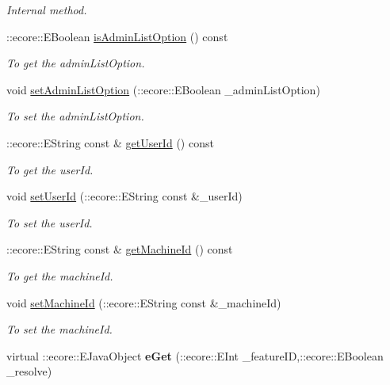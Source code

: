 \begin{DoxyCompactItemize}
\begin{DoxyCompactList}\small\item\em Internal method. \item\end{DoxyCompactList}\item 
::ecore::EBoolean \hyperlink{classUMS__Data_1_1ListLocalAccOptions_adc48e24eb91f9ea3234504bdf3ded823}{isAdminListOption} () const 
\begin{DoxyCompactList}\small\item\em To get the adminListOption. \item\end{DoxyCompactList}\item 
void \hyperlink{classUMS__Data_1_1ListLocalAccOptions_ae4b718d24610744490ca0ccbc248237d}{setAdminListOption} (::ecore::EBoolean \_\-adminListOption)
\begin{DoxyCompactList}\small\item\em To set the adminListOption. \item\end{DoxyCompactList}\item 
::ecore::EString const \& \hyperlink{classUMS__Data_1_1ListLocalAccOptions_a774a83106fad2a13edbb4d61aad772a8}{getUserId} () const 
\begin{DoxyCompactList}\small\item\em To get the userId. \item\end{DoxyCompactList}\item 
void \hyperlink{classUMS__Data_1_1ListLocalAccOptions_a12b06750d86db248c1a47fc21bb3c754}{setUserId} (::ecore::EString const \&\_\-userId)
\begin{DoxyCompactList}\small\item\em To set the userId. \item\end{DoxyCompactList}\item 
::ecore::EString const \& \hyperlink{classUMS__Data_1_1ListLocalAccOptions_ae96211f7f165d81db49cb168c367003e}{getMachineId} () const 
\begin{DoxyCompactList}\small\item\em To get the machineId. \item\end{DoxyCompactList}\item 
void \hyperlink{classUMS__Data_1_1ListLocalAccOptions_a94fdb1871f3b62dec3062358e0f0b905}{setMachineId} (::ecore::EString const \&\_\-machineId)
\begin{DoxyCompactList}\small\item\em To set the machineId. \item\end{DoxyCompactList}\item 
\hypertarget{classUMS__Data_1_1ListLocalAccOptions_a185a557e42eb104dbeda5dff4c82eee8}{
virtual ::ecore::EJavaObject {\bfseries eGet} (::ecore::EInt \_\-featureID,::ecore::EBoolean \_\-resolve)}
\label{classUMS__Data_1_1ListLocalAccOptions_a185a557e42eb104dbeda5dff4c82eee8}


\end{DoxyCompactItemize}
